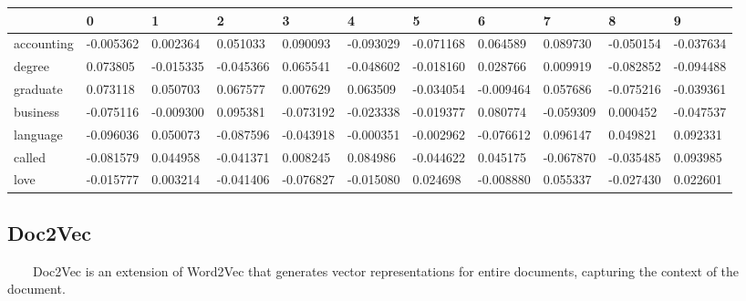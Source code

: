 \documentclass[
  letterpaper,
  DIV=11,
  numbers=noendperiod]{scrreprt}
\newcounter{none} %
\begin{document}
{\def\LTcaptype{none} %
\begin{longtable}[]{@{}lllllllllll@{}}
\toprule\noalign{}
& 0 & 1 & 2 & 3 & 4 & 5 & 6 & 7 & 8 & 9 \\
\midrule\noalign{}
\endhead
\bottomrule\noalign{}
\endlastfoot
accounting & -0.005362 & 0.002364 & 0.051033 & 0.090093 & -0.093029 &
-0.071168 & 0.064589 & 0.089730 & -0.050154 & -0.037634 \\
degree & 0.073805 & -0.015335 & -0.045366 & 0.065541 & -0.048602 &
-0.018160 & 0.028766 & 0.009919 & -0.082852 & -0.094488 \\
graduate & 0.073118 & 0.050703 & 0.067577 & 0.007629 & 0.063509 &
-0.034054 & -0.009464 & 0.057686 & -0.075216 & -0.039361 \\
business & -0.075116 & -0.009300 & 0.095381 & -0.073192 & -0.023338 &
-0.019377 & 0.080774 & -0.059309 & 0.000452 & -0.047537 \\
language & -0.096036 & 0.050073 & -0.087596 & -0.043918 & -0.000351 &
-0.002962 & -0.076612 & 0.096147 & 0.049821 & 0.092331 \\
called & -0.081579 & 0.044958 & -0.041371 & 0.008245 & 0.084986 &
-0.044622 & 0.045175 & -0.067870 & -0.035485 & 0.093985 \\
love & -0.015777 & 0.003214 & -0.041406 & -0.076827 & -0.015080 &
0.024698 & -0.008880 & 0.055337 & -0.027430 & 0.022601 \\
\end{longtable}
}

\subsection{Doc2Vec}\label{doc2vec}

~~~~Doc2Vec is an extension of Word2Vec that generates vector
representations for entire documents, capturing the context of the
document.
\end{document}
